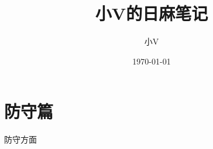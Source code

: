 \documentclass[UTF8,12pt,titlepage,oneside]{ctexbook}
\title{小V的日麻笔记}
\author{小V}
\date{\today}
\begin{document}
\maketitle
\pagestyle{empty}
\tableofcontents

\pagestyle{fancy}


\cleardoublepage


\cleardoublepage


\cleardoublepage
\chapter{防守篇}
防守方面
\cleardoublepage
\end{document}
